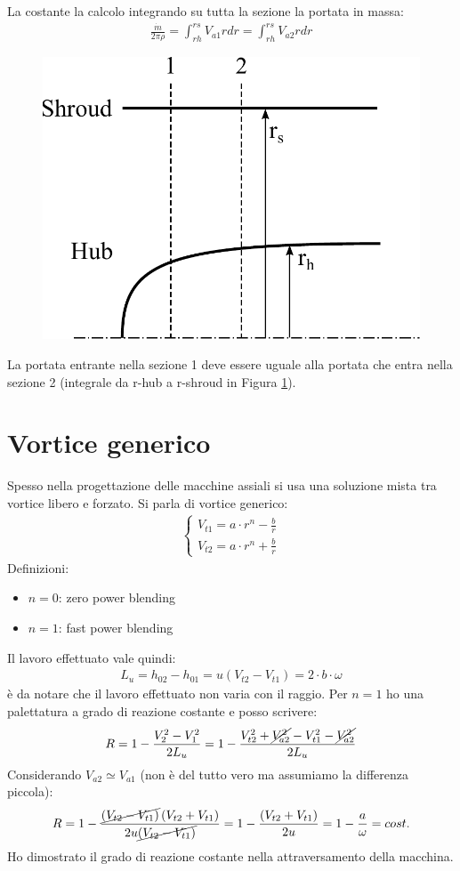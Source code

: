 La costante la calcolo integrando su tutta la sezione la portata in massa:
\begin{align*}
\frac{\dot{m}}{2 \pi \rho} = \int_{rh}^{rs} V_{a1} r dr = \int_{rh}^{rs} V_{a2} r dr
\end{align*}
\begin{figure}[h]
\centering
  \includegraphics[width=.4\textwidth]{fig/HubShroud.pdf}
\caption{}
\label{fig:hubshroud}
\end{figure}
La portata entrante nella sezione 1 deve essere uguale alla portata che entra nella sezione 2 (integrale da r-hub a r-shroud in Figura \ref{fig:hubshroud}).
\section{Vortice generico}
Spesso nella progettazione delle macchine assiali si usa una soluzione mista tra vortice libero e forzato. Si parla di vortice generico:
\begin{align*}
\begin{cases}
V_{t1} = a \cdot r^n - \frac{b}{r}\\
V_{t2} = a \cdot r^n + \frac{b}{r}
\end{cases}
\end{align*}
Definizioni:
\begin{itemize}
\item $n=0$: zero power blending
\item $n=1$: fast power blending
\end{itemize}
Il lavoro effettuato vale quindi:
\begin{align*}
L_u = h_{02} - h_{01} = u \left( V_{t2} - V_{t1} \right) = 2 \cdot b \cdot \omega
\end{align*}
è da notare che il lavoro effettuato non varia con il raggio. Per $n=1$ ho una palettatura a grado di reazione costante e posso scrivere:
\begin{align*}
R = 1 - \frac{V_2^2 - V_1^2}{2 L_u} = 1 - \frac{V_{t2}^2 + \cancel{V_{a2}^2} - V_{t1}^2 - \cancel{V_{a2}^2}}{2 L_u}
\end{align*}
Considerando $V_{a2} \simeq V_{a1}$ (non è del tutto vero ma assumiamo la differenza piccola):
\begin{align*}
R = 1 - \frac{\cancel{\left( V_{t2} - V_{t1} \right)} \left( V_{t2}+ V_{t1} \right)}{2 u \cancel{\left( V_{t2}- V_{t1} \right)}} = 1- \frac{\left( V_{t2}+ V_{t1} \right)}{2 u} = 1-\frac{a}{\omega} = cost.
\end{align*}
Ho dimostrato il grado di reazione costante nella attraversamento della macchina.
